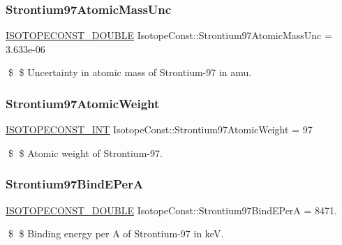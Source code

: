 \subsubsection{\texorpdfstring{Strontium97\+Atomic\+Mass\+Unc}{Strontium97AtomicMassUnc}}
{\footnotesize\ttfamily \mbox{\hyperlink{group___isotope_const-_macros_ga8f45a7272ce02c0b4c65c44636ed719a}{I\+S\+O\+T\+O\+P\+E\+C\+O\+N\+S\+T\+\_\+\+D\+O\+U\+B\+LE}} Isotope\+Const\+::\+Strontium97\+Atomic\+Mass\+Unc = 3.\+633e-\/06}

\$ \$ Uncertainty in atomic mass of Strontium-\/97 in amu. \mbox{\label{group___isotope_const-_strontium-_sr97_ga74a564f3a6d92e5e101128d3c03ec546}} 
\subsubsection{\texorpdfstring{Strontium97\+Atomic\+Weight}{Strontium97AtomicWeight}}
{\footnotesize\ttfamily \mbox{\hyperlink{group___isotope_const-_macros_ga5f18360b3e99483a35c32d789e62621c}{I\+S\+O\+T\+O\+P\+E\+C\+O\+N\+S\+T\+\_\+\+I\+NT}} Isotope\+Const\+::\+Strontium97\+Atomic\+Weight = 97}

\$ \$ Atomic weight of Strontium-\/97. \mbox{\label{group___isotope_const-_strontium-_sr97_ga57bb7f93da6423e140584e0147b01625}} 
\subsubsection{\texorpdfstring{Strontium97\+Bind\+E\+PerA}{Strontium97BindEPerA}}
{\footnotesize\ttfamily \mbox{\hyperlink{group___isotope_const-_macros_ga8f45a7272ce02c0b4c65c44636ed719a}{I\+S\+O\+T\+O\+P\+E\+C\+O\+N\+S\+T\+\_\+\+D\+O\+U\+B\+LE}} Isotope\+Const\+::\+Strontium97\+Bind\+E\+PerA = 8471.}

\$ \$ Binding energy per A of Strontium-\/97 in keV. \mbox{\label{group___isotope_const-_strontium-_sr97_gaf9f5b4ad6a92d2810e0110b5ce2acae4}} 
